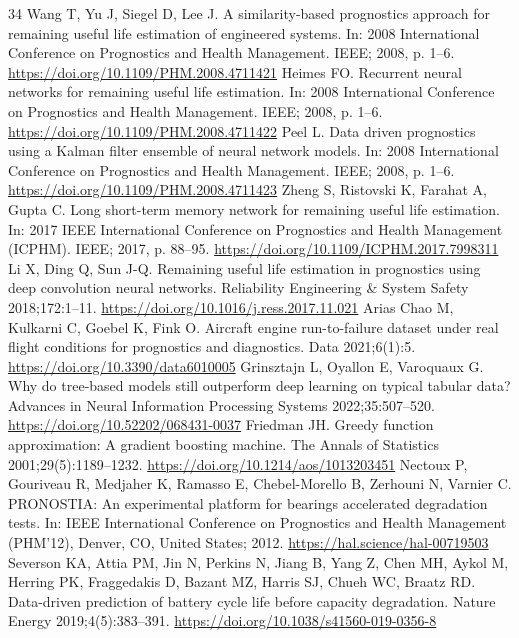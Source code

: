 \documentclass[a4paper,fleqn,doubleblind]{cas-dc}
\begin{document}
\begin{thebibliography}{34}
 Wang T, Yu J, Siegel D, Lee J. A similarity-based prognostics approach for remaining useful life estimation of engineered systems. In: 2008 International Conference on Prognostics and Health Management. IEEE; 2008, p. 1--6. \url{https://doi.org/10.1109/PHM.2008.4711421}
 Heimes FO. Recurrent neural networks for remaining useful life estimation. In: 2008 International Conference on Prognostics and Health Management. IEEE; 2008, p. 1--6. \url{https://doi.org/10.1109/PHM.2008.4711422}
 Peel L. Data driven prognostics using a Kalman filter ensemble of neural network models. In: 2008 International Conference on Prognostics and Health Management. IEEE; 2008, p. 1--6. \url{https://doi.org/10.1109/PHM.2008.4711423}
 Zheng S, Ristovski K, Farahat A, Gupta C. Long short-term memory network for remaining useful life estimation. In: 2017 IEEE International Conference on Prognostics and Health Management (ICPHM). IEEE; 2017, p. 88--95. \url{https://doi.org/10.1109/ICPHM.2017.7998311}
 Li X, Ding Q, Sun J-Q. Remaining useful life estimation in prognostics using deep convolution neural networks. Reliability Engineering \& System Safety 2018;172:1--11. \url{https://doi.org/10.1016/j.ress.2017.11.021}
 Arias Chao M, Kulkarni C, Goebel K, Fink O. Aircraft engine run-to-failure dataset under real flight conditions for prognostics and diagnostics. Data 2021;6(1):5. \url{https://doi.org/10.3390/data6010005}
 Grinsztajn L, Oyallon E, Varoquaux G. Why do tree-based models still outperform deep learning on typical tabular data? Advances in Neural Information Processing Systems 2022;35:507--520. \url{https://doi.org/10.52202/068431-0037}
 Friedman JH. Greedy function approximation: A gradient boosting machine. The Annals of Statistics 2001;29(5):1189--1232. \url{https://doi.org/10.1214/aos/1013203451}
 Nectoux P, Gouriveau R, Medjaher K, Ramasso E, Chebel-Morello B, Zerhouni N, Varnier C. PRONOSTIA: An experimental platform for bearings accelerated degradation tests. In: IEEE International Conference on Prognostics and Health Management (PHM'12), Denver, CO, United States; 2012. \url{https://hal.science/hal-00719503}
 Severson KA, Attia PM, Jin N, Perkins N, Jiang B, Yang Z, Chen MH, Aykol M, Herring PK, Fraggedakis D, Bazant MZ, Harris SJ, Chueh WC, Braatz RD. Data-driven prediction of battery cycle life before capacity degradation. Nature Energy 2019;4(5):383--391. \url{https://doi.org/10.1038/s41560-019-0356-8}

\end{thebibliography}
\end{document}
